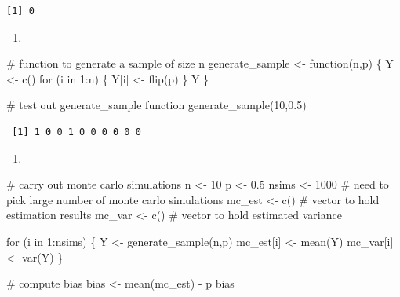 \documentclass[
  letterpaper,
  DIV=11,
  numbers=noendperiod]{scrreprt}
\newenvironment{Shaded}{\begin{snugshade}}{\end{snugshade}}
\newcommand{\CommentTok}[1]{\textcolor[rgb]{0.37,0.37,0.37}{#1}}
\newcommand{\ControlFlowTok}[1]{\textcolor[rgb]{0.00,0.23,0.31}{#1}}
\newcommand{\DecValTok}[1]{\textcolor[rgb]{0.68,0.00,0.00}{#1}}
\newcommand{\FloatTok}[1]{\textcolor[rgb]{0.68,0.00,0.00}{#1}}
\newcommand{\FunctionTok}[1]{\textcolor[rgb]{0.28,0.35,0.67}{#1}}
\newcommand{\NormalTok}[1]{\textcolor[rgb]{0.00,0.23,0.31}{#1}}
\newcommand{\OtherTok}[1]{\textcolor[rgb]{0.00,0.23,0.31}{#1}}
\newcommand{\SpecialCharTok}[1]{\textcolor[rgb]{0.37,0.37,0.37}{#1}}
\providecommand{\tightlist}{%
  \setlength{\itemsep}{0pt}\setlength{\parskip}{0pt}}\usepackage{longtable,booktabs,array}
\begin{document}
\begin{verbatim}
[1] 0
\end{verbatim}

\begin{enumerate}
\def\labelenumi{\arabic{enumi}.}
\setcounter{enumi}{1}
\tightlist
\item
\end{enumerate}

\begin{Shaded}
\begin{Highlighting}[]
\CommentTok{\# function to generate a sample of size n}
\NormalTok{generate\_sample }\OtherTok{\textless{}{-}} \ControlFlowTok{function}\NormalTok{(n,p) \{}
\NormalTok{  Y }\OtherTok{\textless{}{-}} \FunctionTok{c}\NormalTok{()}
  \ControlFlowTok{for}\NormalTok{ (i }\ControlFlowTok{in} \DecValTok{1}\SpecialCharTok{:}\NormalTok{n) \{}
\NormalTok{    Y[i] }\OtherTok{\textless{}{-}} \FunctionTok{flip}\NormalTok{(p)}
\NormalTok{  \}}
\NormalTok{  Y}
\NormalTok{\}}

\CommentTok{\# test out generate\_sample function}
\FunctionTok{generate\_sample}\NormalTok{(}\DecValTok{10}\NormalTok{,}\FloatTok{0.5}\NormalTok{)}
\end{Highlighting}
\end{Shaded}

\begin{verbatim}
 [1] 1 0 0 1 0 0 0 0 0 0
\end{verbatim}

\begin{enumerate}
\def\labelenumi{\arabic{enumi}.}
\setcounter{enumi}{2}
\tightlist
\item
\end{enumerate}

\begin{Shaded}
\begin{Highlighting}[]
\CommentTok{\# carry out monte carlo simulations}
\NormalTok{n }\OtherTok{\textless{}{-}} \DecValTok{10}
\NormalTok{p }\OtherTok{\textless{}{-}} \FloatTok{0.5}
\NormalTok{nsims }\OtherTok{\textless{}{-}} \DecValTok{1000}  \CommentTok{\# need to pick large number of monte carlo simulations}
\NormalTok{mc\_est }\OtherTok{\textless{}{-}} \FunctionTok{c}\NormalTok{()  }\CommentTok{\# vector to hold estimation results}
\NormalTok{mc\_var }\OtherTok{\textless{}{-}} \FunctionTok{c}\NormalTok{()  }\CommentTok{\# vector to hold estimated variance}

\ControlFlowTok{for}\NormalTok{ (i }\ControlFlowTok{in} \DecValTok{1}\SpecialCharTok{:}\NormalTok{nsims) \{}
\NormalTok{  Y }\OtherTok{\textless{}{-}} \FunctionTok{generate\_sample}\NormalTok{(n,p)}
\NormalTok{  mc\_est[i] }\OtherTok{\textless{}{-}} \FunctionTok{mean}\NormalTok{(Y)}
\NormalTok{  mc\_var[i] }\OtherTok{\textless{}{-}} \FunctionTok{var}\NormalTok{(Y)}
\NormalTok{\}}

\CommentTok{\# compute bias}
\NormalTok{bias }\OtherTok{\textless{}{-}} \FunctionTok{mean}\NormalTok{(mc\_est) }\SpecialCharTok{{-}}\NormalTok{ p}
\NormalTok{bias}
\end{Highlighting}
\end{Shaded}
\end{document}
